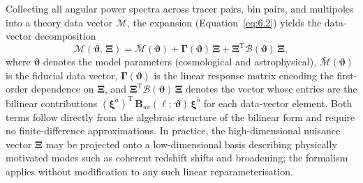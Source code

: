 Collecting all angular power spectra across tracer pairs, bin pairs, and multipoles into a theory data vector \(\boldsymbol{\mathcal{M}}\), the expansion (Equation~\ref{eq:6.2}) yields the data-vector decomposition
\begin{equation} \label{eq:6.3}
    \boldsymbol{\mathcal{M}}(\boldsymbol{\vartheta},\, \boldsymbol{\Xi}) = \bar{\boldsymbol{\mathcal{M}}}(\boldsymbol{\vartheta}) + \boldsymbol{\Gamma}(\boldsymbol{\vartheta})\, \boldsymbol{\Xi} + \boldsymbol{\Xi}^{\mathrm{T}} \boldsymbol{\mathcal{B}}(\boldsymbol{\vartheta})\, \boldsymbol{\Xi},
\end{equation}
where \(\boldsymbol{\vartheta}\) denotes the model parameters (cosmological and astrophysical), \(\bar{\boldsymbol{\mathcal{M}}}(\boldsymbol{\vartheta})\) is the fiducial data vector, \(\boldsymbol{\Gamma}(\boldsymbol{\vartheta})\) is the linear response matrix encoding the first-order dependence on \(\boldsymbol{\Xi}\), and \(\boldsymbol{\Xi}^{\mathrm{T}} \boldsymbol{\mathcal{B}}(\boldsymbol{\vartheta})\, \boldsymbol{\Xi}\) denotes the vector whose entries are the bilinear contributions \((\boldsymbol{\xi}^{a})^{\mathrm{T}}\, \boldsymbol{B}_{uv}(\ell;\,\boldsymbol{\vartheta})\, \boldsymbol{\xi}^b\) for each data-vector element. Both terms follow directly from the algebraic structure of the bilinear form and require no finite-difference approximations. In practice, the high-dimensional nuisance vector \(\boldsymbol{\Xi}\) may be projected onto a low-dimensional basis describing physically motivated modes such as coherent redshift shifts and broadening; the formalism applies without modification to any such linear reparameterisation.

